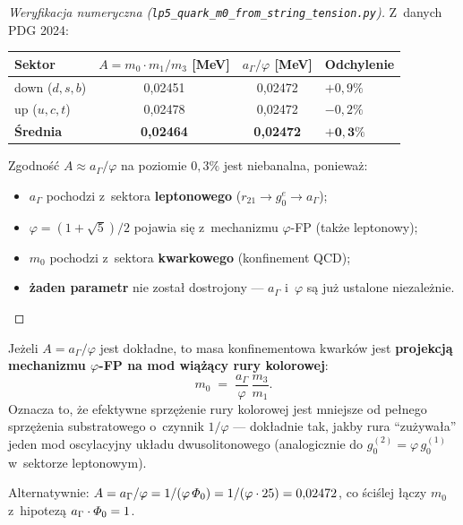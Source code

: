 \begin{proof}[Weryfikacja numeryczna (\texttt{lp5\_quark\_m0\_from\_string\_tension.py})]
Z~danych PDG 2024:
\begin{center}\footnotesize
\begin{tabular}{@{}lccl@{}}
\toprule
  Sektor & $A = m_0 \cdot m_1/m_3$ [MeV] & $a_\Gamma/\varphi$ [MeV]
    & Odchylenie \\
\midrule
  down ($d, s, b$) & 0{,}02451 & 0{,}02472 & $+0{,}9\%$ \\
  up ($u, c, t$)   & 0{,}02478 & 0{,}02472 & $-0{,}2\%$ \\
\midrule
  \textbf{\'Srednia} & \textbf{0{,}02464} & \textbf{0{,}02472}
    & $\mathbf{+0{,}3\%}$ \\
\bottomrule
\end{tabular}
\end{center}
Zgodność $A \approx a_\Gamma/\varphi$ na poziomie $0{,}3\%$
jest niebanalna, poniewa\.z:
\begin{itemize}[nosep]
  \item $a_\Gamma$ pochodzi z~sektora \textbf{leptonowego}
    ($r_{21} \to g_0^e \to a_\Gamma$);
  \item $\varphi = (1+\sqrt{5})/2$ pojawia się z~mechanizmu
    $\varphi$-FP (tak\.ze leptonowy);
  \item $m_0$ pochodzi z~sektora \textbf{kwarkowego}
    (konfinement QCD);
  \item \textbf{\.zaden parametr} nie zosta\l{} dostrojony
    --- $a_\Gamma$ i~$\varphi$ s\k{a} ju\.z ustalone
    niezale\.znie.
\end{itemize}
\end{proof}

\begin{remark}\label{rem:X-A-interpretation}
Je\.zeli $A = a_\Gamma/\varphi$ jest dok\l{}adne, to masa
konfinementowa kwark\'ow jest \textbf{projekcj\k{a}
mechanizmu $\varphi$-FP na mod wi\k{a}\.z\k{a}cy rury kolorowej}:
\begin{equation}
  m_0 \;=\; \frac{a_\Gamma}{\varphi}\,\frac{m_3}{m_1}.
\end{equation}
Oznacza to, \.ze efektywne sprzężenie rury kolorowej jest
mniejsze od pe\l{}nego sprzężenia substratowego o~czynnik
$1/\varphi$ --- dok\l{}adnie tak, jakby rura ``zu\.zywa\l{}a''
jeden mod oscylacyjny uk\l{}adu dwusolitonowego
(analogicznie do $g_0^{(2)} = \varphi\,g_0^{(1)}$ w~sektorze
leptonowym).

Alternatywnie: $A = a_\Gamma/\varphi = 1/(\varphi\,\varPhi_0)
= 1/(\varphi \cdot 25) = 0{,}02472$, co \'sci\'slej
\l{}\k{a}czy $m_0$ z~hipotez\k{a}
$a_\Gamma \cdot \varPhi_0 = 1$.
\end{remark}

